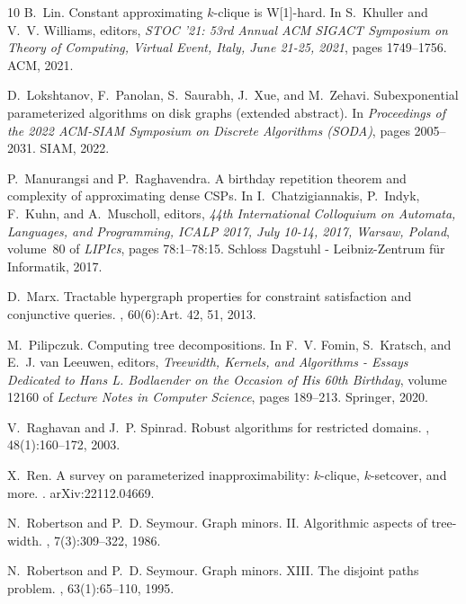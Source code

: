 \documentclass[11pt]{article}
\theoremstyle{definition}
\begin{document}
\begin{thebibliography}{10}
B.~Lin.
\newblock Constant approximating $k$-clique is {W}[1]-hard.
\newblock In S.~Khuller and V.~V. Williams, editors, {\em {STOC} '21: 53rd
  Annual {ACM} {SIGACT} Symposium on Theory of Computing, Virtual Event, Italy,
  June 21-25, 2021}, pages 1749--1756. {ACM}, 2021.

D.~Lokshtanov, F.~Panolan, S.~Saurabh, J.~Xue, and M.~Zehavi.
\newblock Subexponential parameterized algorithms on disk graphs (extended
  abstract).
\newblock In {\em Proceedings of the 2022 {ACM-SIAM} Symposium on Discrete
  Algorithms (SODA)}, pages 2005--2031. {SIAM}, 2022.

P.~Manurangsi and P.~Raghavendra.
\newblock A birthday repetition theorem and complexity of approximating dense
  {CSP}s.
\newblock In I.~Chatzigiannakis, P.~Indyk, F.~Kuhn, and A.~Muscholl, editors,
  {\em 44th International Colloquium on Automata, Languages, and Programming,
  {ICALP} 2017, July 10-14, 2017, Warsaw, Poland}, volume~80 of {\em LIPIcs},
  pages 78:1--78:15. Schloss Dagstuhl - Leibniz-Zentrum f{\"{u}}r Informatik,
  2017.

D.~Marx.
\newblock Tractable hypergraph properties for constraint satisfaction and
  conjunctive queries.
, 60(6):Art. 42, 51, 2013.

M.~Pilipczuk.
\newblock Computing tree decompositions.
\newblock In F.~V. Fomin, S.~Kratsch, and E.~J. van Leeuwen, editors, {\em
  Treewidth, Kernels, and Algorithms - Essays Dedicated to Hans L. Bodlaender
  on the Occasion of His 60th Birthday}, volume 12160 of {\em Lecture Notes in
  Computer Science}, pages 189--213. Springer, 2020.

V.~Raghavan and J.~P. Spinrad.
\newblock Robust algorithms for restricted domains.
, 48(1):160--172, 2003.

X.~Ren.
\newblock A survey on parameterized inapproximability: $k$-clique,
  $k$-setcover, and more.
.
\newblock arXiv:22112.04669.

N.~Robertson and P.~D. Seymour.
\newblock Graph minors. {II.} {A}lgorithmic aspects of tree-width.
, 7(3):309--322, 1986.

N.~Robertson and P.~D. Seymour.
\newblock Graph minors. {XIII}. {T}he disjoint paths problem.
, 63(1):65--110, 1995.


\end{thebibliography}
\end{document}
